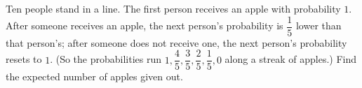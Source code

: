 Ten people stand in a line. The first person receives an apple with probability $1$. After someone receives an apple, the next person's probability is $\dfrac15$ lower than that person's; after someone does not receive one, the next person's probability resets to $1$. (So the probabilities run $1,\dfrac45,\dfrac35,\dfrac25,\dfrac15,0$ along a streak of apples.) Find the expected number of apples given out.
